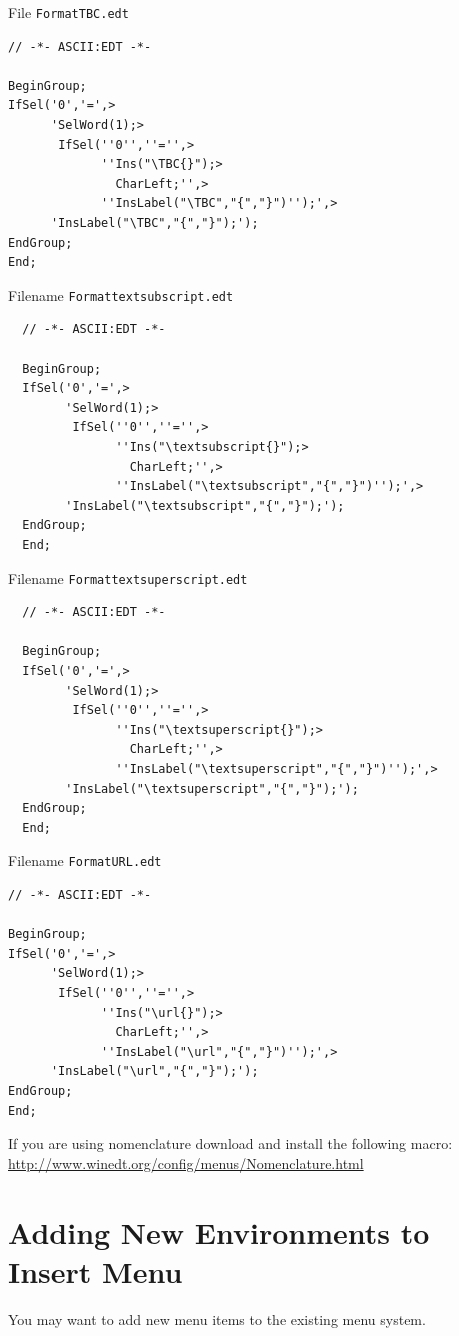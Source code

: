 File \texttt{FormatTBC.edt}
\begin{lstlisting}
// -*- ASCII:EDT -*-

BeginGroup;
IfSel('0','=',>
      'SelWord(1);>
       IfSel(''0'',''='',>
             ''Ins("\TBC{}");>
               CharLeft;'',>
             ''InsLabel("\TBC","{","}")'');',>
      'InsLabel("\TBC","{","}");');
EndGroup;
End;
\end{lstlisting}


Filename \texttt{Formattextsubscript.edt}
\begin{lstlisting}
  // -*- ASCII:EDT -*-

  BeginGroup;
  IfSel('0','=',>
        'SelWord(1);>
         IfSel(''0'',''='',>
               ''Ins("\textsubscript{}");>
                 CharLeft;'',>
               ''InsLabel("\textsubscript","{","}")'');',>
        'InsLabel("\textsubscript","{","}");');
  EndGroup;
  End;
\end{lstlisting}


Filename \texttt{Formattextsuperscript.edt}
\begin{lstlisting}
  // -*- ASCII:EDT -*-

  BeginGroup;
  IfSel('0','=',>
        'SelWord(1);>
         IfSel(''0'',''='',>
               ''Ins("\textsuperscript{}");>
                 CharLeft;'',>
               ''InsLabel("\textsuperscript","{","}")'');',>
        'InsLabel("\textsuperscript","{","}");');
  EndGroup;
  End;
\end{lstlisting}

Filename \texttt{FormatURL.edt}
\begin{lstlisting}
// -*- ASCII:EDT -*-

BeginGroup;
IfSel('0','=',>
      'SelWord(1);>
       IfSel(''0'',''='',>
             ''Ins("\url{}");>
               CharLeft;'',>
             ''InsLabel("\url","{","}")'');',>
      'InsLabel("\url","{","}");');
EndGroup;
End;
\end{lstlisting}


If you are using nomenclature download and install the following macro:\\
\url{http://www.winedt.org/config/menus/Nomenclature.html}

\section{Adding New Environments to Insert Menu}

You may want to add new menu items to the existing menu system.

